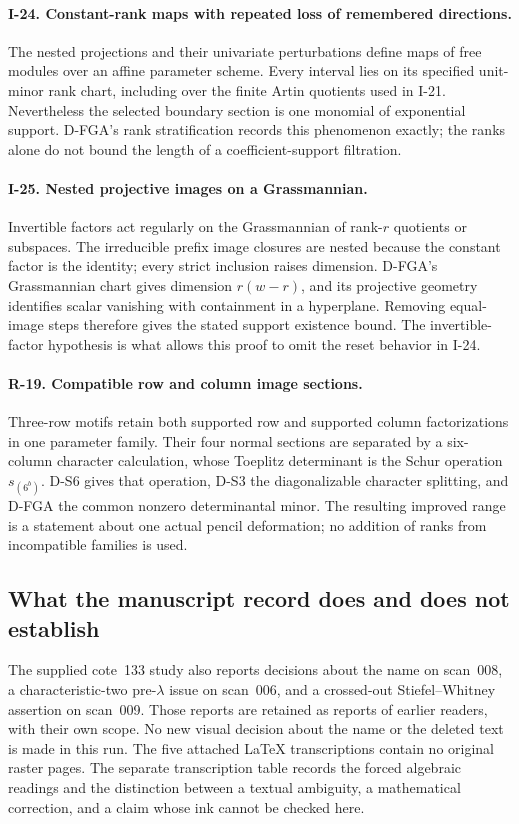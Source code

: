 \paragraph{I-24. Constant-rank maps with repeated loss of remembered directions.}
The nested projections and their univariate perturbations define maps of free modules over an affine parameter scheme. Every interval lies on its specified unit-minor rank chart, including over the finite Artin quotients used in I-21. Nevertheless the selected boundary section is one monomial of exponential support. D-FGA's rank stratification records this phenomenon exactly; the ranks alone do not bound the length of a coefficient-support filtration.

\paragraph{I-25. Nested projective images on a Grassmannian.}
Invertible factors act regularly on the Grassmannian of rank-$r$ quotients or subspaces. The irreducible prefix image closures are nested because the constant factor is the identity; every strict inclusion raises dimension. D-FGA's Grassmannian chart gives dimension $r(w-r)$, and its projective geometry identifies scalar vanishing with containment in a hyperplane. Removing equal-image steps therefore gives the stated support existence bound. The invertible-factor hypothesis is what allows this proof to omit the reset behavior in I-24.

\paragraph{R-19. Compatible row and column image sections.}
Three-row motifs retain both supported row and supported column factorizations in one parameter family. Their four normal sections are separated by a six-column character calculation, whose Toeplitz determinant is the Schur operation $s_{(6^b)}$. D-S6 gives that operation, D-S3 the diagonalizable character splitting, and D-FGA the common nonzero determinantal minor. The resulting improved range is a statement about one actual pencil deformation; no addition of ranks from incompatible families is used.

\subsection{What the manuscript record does and does not establish}
The supplied cote~133 study also reports decisions about the name on scan~008, a characteristic-two pre-$\lambda$ issue on scan~006, and a crossed-out Stiefel--Whitney assertion on scan~009. Those reports are retained as reports of earlier readers, with their own scope. No new visual decision about the name or the deleted text is made in this run. The five attached LaTeX transcriptions contain no original raster pages. The separate transcription table records the forced algebraic readings and the distinction between a textual ambiguity, a mathematical correction, and a claim whose ink cannot be checked here.
